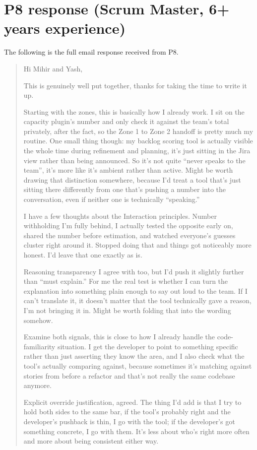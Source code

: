 \documentclass[a4paper,twoside]{bth}
\begin{document}
\section*{P8 response (Scrum Master, 6+ years experience)}

The following is the full email response received from P8.

\begin{quote}
Hi Mihir and Yash,

This is genuinely well put together, thanks for taking the time to write it up.

Starting with the zones, this is basically how I already work. I sit on the capacity plugin's number and only check it against the team's total privately, after the fact, so the Zone 1 to Zone 2 handoff is pretty much my routine. One small thing though: my backlog scoring tool is actually visible the whole time during refinement and planning, it's just sitting in the Jira view rather than being announced. So it's not quite ``never speaks to the team'', it's more like it's ambient rather than active. Might be worth drawing that distinction somewhere, because I'd treat a tool that's just sitting there differently from one that's pushing a number into the conversation, even if neither one is technically ``speaking.''

I have a few thoughts about the Interaction principles. Number withholding I'm fully behind, I actually tested the opposite early on, shared the number before estimation, and watched everyone's guesses cluster right around it. Stopped doing that and things got noticeably more honest. I'd leave that one exactly as is.

Reasoning transparency I agree with too, but I'd push it slightly further than ``must explain.'' For me the real test is whether I can turn the explanation into something plain enough to say out loud to the team. If I can't translate it, it doesn't matter that the tool technically gave a reason, I'm not bringing it in. Might be worth folding that into the wording somehow.

Examine both signals, this is close to how I already handle the code-familiarity situation. I get the developer to point to something specific rather than just asserting they know the area, and I also check what the tool's actually comparing against, because sometimes it's matching against stories from before a refactor and that's not really the same codebase anymore.

Explicit override justification, agreed. The thing I'd add is that I try to hold both sides to the same bar, if the tool's probably right and the developer's pushback is thin, I go with the tool; if the developer's got something concrete, I go with them. It's less about who's right more often and more about being consistent either way.


\end{quote}
\end{document}
